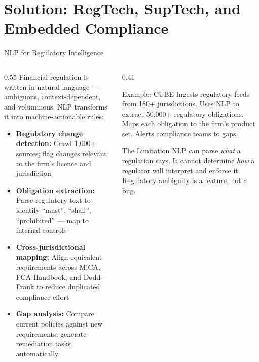 \section{Solution: RegTech, SupTech, and Embedded Compliance}

\begin{frame}{NLP for Regulatory Intelligence}
  \begin{columns}[T]
    \begin{column}{0.55\textwidth}
      Financial regulation is written in \textcolor{mlpurple}{natural language} ---
      ambiguous, context-dependent, and voluminous. NLP transforms it into
      machine-actionable rules:
      \vspace{0.4em}
      \begin{itemize}
        \item \textbf{Regulatory change detection:} Crawl 1,000+ sources;
              flag changes relevant to the firm's licence and jurisdiction
        \item \textbf{Obligation extraction:} Parse regulatory text to
              identify ``must'', ``shall'', ``prohibited'' --- map to
              internal controls
        \item \textbf{Cross-jurisdictional mapping:} Align equivalent
              requirements across MiCA, FCA Handbook, and Dodd-Frank to
              reduce duplicated compliance effort
        \item \textbf{Gap analysis:} Compare current policies against new
              requirements; generate remediation tasks automatically
      \end{itemize}
    \end{column}
    \begin{column}{0.41\textwidth}
      \begin{block}{Example: CUBE}
        Ingests regulatory feeds from 180+ jurisdictions. Uses NLP to
        extract 50,000+ regulatory obligations. Maps each obligation to
        the firm's product set. Alerts compliance teams to gaps.
      \end{block}
      \vspace{0.3em}
      \begin{alertblock}{The Limitation}
        NLP can parse \textit{what} a regulation says. It cannot determine
        \textit{how} a regulator will \textcolor{mlred}{interpret and
        enforce} it. Regulatory ambiguity is a feature, not a bug.
      \end{alertblock}
    \end{column}
  \end{columns}
\end{frame}

